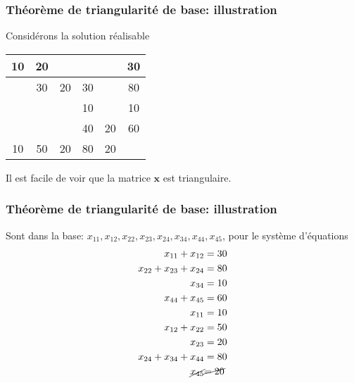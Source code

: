 \documentclass[usepdftitle=false]{beamer}
\def\bx{\boldsymbol{x}}
\begin{document}
\begin{frame}
\frametitle{Théorème de triangularité de base: illustration}

Considérons la solution réalisable
\begin{center}
\begin{tabular}{|c|c|c|c|c|c}
\hline
10 & 20 & & & & 30 \\
\hline
& 30 & 20 & 30 & & 80 \\
\hline
& & & 10 & & 10 \\
\hline
& & & 40 & 20 & 60 \\
\hline
10 & 50 & 20 & 80 & 20 & \\
\end{tabular}
\end{center}
Il est facile de voir que la matrice $\bx$ est triangulaire.

\end{frame}

\begin{frame}
\frametitle{Théorème de triangularité de base: illustration}

Sont dans la base: $x_{11}, x_{12}, x_{22}, x_{23}, x_{24}, x_{34}, x_{44}, x_{45}$, pour le système d'équations
\begin{align*}
x_{11} + x_{12} &= 30 \\
x_{22} + x_{23} + x_{24} &= 80 \\
x_{34} &= 10 \\
x_{44} + x_{45} &= 60 \\
x_{11} & = 10 \\
x_{12} + x_{22} &= 50 \\
x_{23} &= 20 \\
x_{24} + x_{34} + x_{44} &= 80 \\
\cancel{x_{45}} &\cancel{= 20}
\end{align*}

\end{frame}
\end{document}
